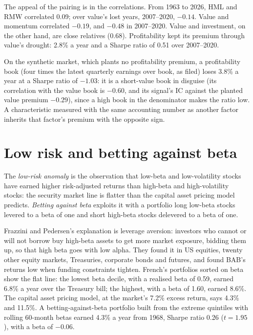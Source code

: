 The appeal of the pairing is in the correlations. From 1963 to 2026, HML and RMW correlated 0.09; over value's lost years, 2007--2020, $-0.14$. Value and
momentum correlated $-0.19$, and $-0.48$ in 2007--2020. Value and investment, on the other hand, are close relatives (0.68). Profitability kept its premium
through value's drought: 2.8\% a year and a Sharpe ratio of 0.51 over 2007--2020.

On the synthetic market, which plants no profitability premium, a profitability book (four times the latest quarterly earnings over book, as filed) loses
3.8\% a year at a Sharpe ratio of $-1.03$: it is a short-value book in disguise (its correlation with the value book is $-0.60$, and its signal's IC against
the planted value premium $-0.29$), since a high book in the denominator makes the ratio low. A characteristic measured with the same accounting number as
another factor inherits that factor's premium with the opposite sign.

\section{Low risk and betting against beta}

\begin{definition}\label{def:s1:value-quality-and-low-risk:bab}
The \emph{low-risk anomaly} is the observation that low-beta and low-volatility stocks have earned higher risk-adjusted returns than
high-beta and high-volatility stocks: the security market line is flatter than the capital asset pricing model predicts. \emph{Betting against
beta} exploits it with a portfolio long low-beta stocks levered to a beta of one and short high-beta stocks delevered to a beta of
one.
\end{definition}

Frazzini and Pedersen's explanation is leverage aversion: investors who cannot or will not borrow buy high-beta assets to get more market exposure, bidding
them up, so that high beta goes with low alpha. They found it in US equities, twenty other equity markets, Treasuries, corporate bonds and futures, and
found BAB's returns low when funding constraints tighten. French's portfolios sorted on beta show the flat line: the lowest beta decile, with a realised beta
of 0.59, earned 6.8\% a year over the Treasury bill; the highest, with a beta of 1.60, earned 8.6\%. The capital asset pricing model, at the market's 7.2\%
excess return, says 4.3\% and 11.5\%. A betting-against-beta portfolio built from the extreme quintiles with rolling 60-month betas earned 4.3\% a year
from 1968, Sharpe ratio 0.26 ($t = 1.95$), with a beta of $-0.06$.

